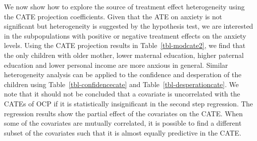 \documentclass[
  12pt,
  12pt]{article}
\numberwithin{equation}{section}
\theoremstyle{definition}
\theoremstyle{plain}
\theoremstyle{plain}
\theoremstyle{remark}
\begin{document}
We now show how to explore the source of treatment effect heterogeneity
using the CATE projection coefficients. Given that the ATE on anxiety is
not significant but heterogeneity is suggested by the hypothesis test,
we are interested in the subpopulations with positive or negative
treatment effects on the anxiety levels. Using the CATE projection
results in Table~\ref{tbl-modcate2}, we find that the only children with
older mother, lower maternal education, higher paternal education and
lower personal income are more anxious in general. Similar heterogeneity
analysis can be applied to the confidence and desperation of the
children using Table~\ref{tbl-confidencecate} and
Table~\ref{tbl-desperationcate}. We note that it should not be concluded
that a covariate is uncorrelated with the CATEs of OCP if it is
statistically insignificant in the second step regression. The
regression results show the partial effect of the covariates on the
CATE. When some of the covariates are mutually correlated, it is
possible to find a different subset of the covariates such that it is
almost equally predictive in the CATE.
\end{document}
